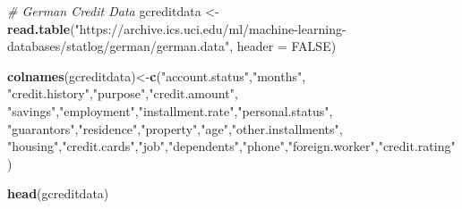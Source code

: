\documentclass[]{book}
\newenvironment{Shaded}{\begin{snugshade}}{\end{snugshade}}
\newcommand{\KeywordTok}[1]{\textcolor[rgb]{0.13,0.29,0.53}{\textbf{#1}}}
\newcommand{\DataTypeTok}[1]{\textcolor[rgb]{0.13,0.29,0.53}{#1}}
\newcommand{\StringTok}[1]{\textcolor[rgb]{0.31,0.60,0.02}{#1}}
\newcommand{\CommentTok}[1]{\textcolor[rgb]{0.56,0.35,0.01}{\textit{#1}}}
\newcommand{\OtherTok}[1]{\textcolor[rgb]{0.56,0.35,0.01}{#1}}
\newcommand{\NormalTok}[1]{#1}
\begin{document}
\begin{Shaded}
\begin{Highlighting}[]
\CommentTok{# German Credit Data}
\NormalTok{gcreditdata <-}\StringTok{ }\KeywordTok{read.table}\NormalTok{(}\StringTok{"https://archive.ics.uci.edu/ml/machine-learning-databases/statlog/german/german.data"}\NormalTok{, }\DataTypeTok{header =} \OtherTok{FALSE}\NormalTok{)}

\KeywordTok{colnames}\NormalTok{(gcreditdata)<-}\KeywordTok{c}\NormalTok{(}\StringTok{"account.status"}\NormalTok{,}\StringTok{"months"}\NormalTok{,}
                \StringTok{"credit.history"}\NormalTok{,}\StringTok{"purpose"}\NormalTok{,}\StringTok{"credit.amount"}\NormalTok{,}
                \StringTok{"savings"}\NormalTok{,}\StringTok{"employment"}\NormalTok{,}\StringTok{"installment.rate"}\NormalTok{,}\StringTok{"personal.status"}\NormalTok{,}
                \StringTok{"guarantors"}\NormalTok{,}\StringTok{"residence"}\NormalTok{,}\StringTok{"property"}\NormalTok{,}\StringTok{"age"}\NormalTok{,}\StringTok{"other.installments"}\NormalTok{,}
                \StringTok{"housing"}\NormalTok{,}\StringTok{"credit.cards"}\NormalTok{,}\StringTok{"job"}\NormalTok{,}\StringTok{"dependents"}\NormalTok{,}\StringTok{"phone"}\NormalTok{,}\StringTok{"foreign.worker"}\NormalTok{,}\StringTok{"credit.rating"}\NormalTok{)}

\KeywordTok{head}\NormalTok{(gcreditdata)}
\end{Highlighting}
\end{Shaded}
\end{document}
